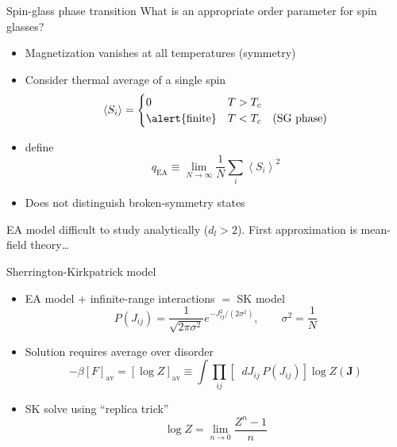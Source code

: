 \documentclass{beamer}
\newcommand{\av}[1]{\left<#1\right>}
\newcommand{\sbr}[1]{\left[#1\right]}
\newcommand{\dav}[1]{\sbr{#1}_{\text{av}}}
\newcommand{\dif}{\mathop{}\!d}
\newcommand{\qea}{q_{\text{EA}}}
\renewcommand{\vec}[1]{\bm{#1}}
\begin{document}
\begin{frame}{Spin-glass phase transition}
  \alert{What is an appropriate order parameter for spin glasses?}
  \begin{itemize}
    \item Magnetization vanishes at all temperatures (symmetry)
    \item Consider thermal average of a single spin
      \begin{equation*}
        \av{S_i}=
        \begin{cases}
          0 & T > T_c \\
          \text{\alert{finite}} & T < T_c \quad \text{(SG phase)}
        \end{cases}
      \end{equation*}
    \item \textcite{edwards1975theory} define
      \begin{equation*}
        \qea \equiv \lim_{N\to\infty} \frac{1}{N} \sum_i \av{S_i}^2
      \end{equation*}
    \item Does \alert{not} distinguish broken-symmetry states
  \end{itemize}
  EA model difficult to study analytically ($d_l>2$). First approximation is
  \alert{mean-field theory}\dots
\end{frame}

\begin{frame}{Sherrington-Kirkpatrick model}
  \begin{itemize}
    \item EA model $+$ infinite-range interactions $=$ SK  model
    \begin{equation*}
      P(J_{ij}) =
      \frac{1}{\sqrt{2\pi\sigma^2}} e^{-J_{ij}^2/(2\sigma^2)},\qquad
      \sigma^2 = \frac{1}{N}
    \end{equation*}
    \item Solution requires average over disorder
    \begin{equation*}
      -\beta\dav{F}=
      \dav{\log Z} \equiv
      \int\prod_{ij}\sbr{\dif J_{ij}\,P(J_{ij})} \log Z(\vec{J})
    \end{equation*}
    \item SK solve using \alert{``replica trick''}
    \begin{equation*}
      \log Z = \lim_{n \to 0} \frac{Z^n - 1}{n}
    \end{equation*}
  \end{itemize}
\end{frame}
\end{document}
